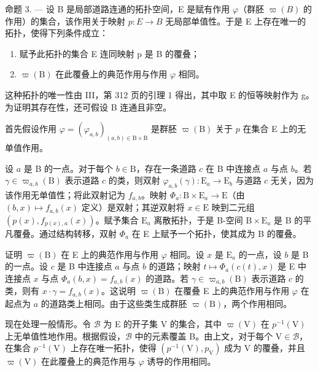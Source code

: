 命题 3. --- 设 B 是局部道路连通的拓扑空间，E 是赋有作用 \(\varphi\)（群胚 \(\varpi(B)\) 的作用）的集合，该作用关于映射 \(p: E \to B\) 无局部单值性。于是 E 上存在唯一的拓扑，使得下列条件成立：

\begin{enumerate}
\def\labelenumi{(\roman{enumi})}
\item
  赋予此拓扑的集合 E 连同映射 p 是 B 的覆叠；
\item
  \(\varpi(\mathrm{B})\) 在此覆叠上的典范作用与作用 \(\varphi\) 相同。
\end{enumerate}

这种拓扑的唯一性由 III，第 312 页的引理 1 得出，其中取 E 的恒等映射作为 g。为证明其存在性，还可假设 B 连通且非空。

首先假设作用 \(\varphi = (\varphi_{a,b})_{(a,b)\in \mathrm{B}\times \mathrm{B}}\) 是群胚 \(\varpi (\mathrm{B})\) 关于 \(p\) 在集合 E 上的无单值作用。

设 \(a\) 是 B 的一点。对于每个 \(b \in \mathrm{B}\)，存在一条道路 \(c\) 在 B 中连接点 \(a\) 与点 \(b\)。若 \(\gamma \in \varpi_{a,b}(\mathrm{B})\) 表示道路 \(c\) 的类，则双射 \(\varphi_{a,b}(\gamma) \colon \mathrm{E}_a \to \mathrm{E}_b\) 与道路 \(c\) 无关，因为该作用无单值性；将此双射记为 \(f_{a,b}\)。映射 \(\Phi_a \colon \mathrm{B} \times \mathrm{E}_a \to \mathrm{E}\)（由 \((b,x) \mapsto f_{a,b}(x)\) 定义）是双射；其逆双射将 \(x \in \mathrm{E}\) 映到二元组 \((p(x), f_{p(x),a}(x))\)。赋予集合 \(\mathrm{E}_a\) 离散拓扑，于是 B-空间 \(\mathrm{B} \times \mathrm{E}_a\) 是 B 的平凡覆叠。通过结构转移，双射 \(\Phi_a\) 在 E 上赋予一个拓扑，使其成为 B 的覆叠。

证明 \(\varpi(\mathrm{B})\) 在 E 上的典范作用与作用 \(\varphi\) 相同。设 \(x\) 是 \(\mathrm{E}_a\) 的一点，设 \(b\) 是 B 的一点。设 \(c\) 是 B 中连接点 \(a\) 与点 \(b\) 的道路；映射 \(t \mapsto \Phi_a(c(t), x)\) 是 E 中连接点 \(x\) 与点 \(\Phi_a(b, x) = f_{a,b}(x)\) 的道路。若 \(\gamma \in \varpi_{a,b}(\mathrm{B})\) 表示道路 \(c\) 的类，则有 \(x \cdot \gamma = f_{a,b}(x)\)。这说明 \(\varpi(\mathrm{B})\) 在覆叠 E 上的典范作用与作用 \(\varphi\) 在起点为 \(a\) 的道路类上相同。由于这些类生成群胚 \(\varpi(\mathrm{B})\)，两个作用相同。

现在处理一般情形。令 \(\mathcal{B}\) 为 E 的开子集 V 的集合，其中 \(\varpi(\mathrm{V})\) 在 \(p^{-1}(\mathrm{V})\) 上无单值性地作用。根据假设，\(\mathcal{B}\) 中的元素覆盖 B。由上文，对于每个 \(\mathrm{V} \in \mathcal{B}\)，在集合 \(p^{-1}(\mathrm{V})\) 上存在唯一拓扑，使得 \((p^{-1}(\mathrm{V}), p_{\mathrm{V}})\) 成为 V 的覆叠，并且 \(\varpi(\mathrm{V})\) 在此覆叠上的典范作用与 \(\varphi\) 诱导的作用相同。

